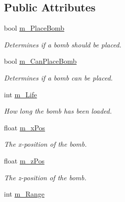 \subsection*{Public Attributes}
\begin{DoxyCompactItemize}
\item 
\hypertarget{classBomb_ab7ac6005ef2beadd2fd6f7895ea9ac70}{bool \hyperlink{classBomb_ab7ac6005ef2beadd2fd6f7895ea9ac70}{m\-\_\-\-Place\-Bomb}}\label{classBomb_ab7ac6005ef2beadd2fd6f7895ea9ac70}

\begin{DoxyCompactList}\small\item\em Determines if a bomb should be placed. \end{DoxyCompactList}\item 
\hypertarget{classBomb_a0e15b6445f078dde98ba005c6f425be4}{bool \hyperlink{classBomb_a0e15b6445f078dde98ba005c6f425be4}{m\-\_\-\-Can\-Place\-Bomb}}\label{classBomb_a0e15b6445f078dde98ba005c6f425be4}

\begin{DoxyCompactList}\small\item\em Determines if a bomb can be placed. \end{DoxyCompactList}\item 
\hypertarget{classBomb_a34b32071d8e343a68e9e9f0d57032930}{int \hyperlink{classBomb_a34b32071d8e343a68e9e9f0d57032930}{m\-\_\-\-Life}}\label{classBomb_a34b32071d8e343a68e9e9f0d57032930}

\begin{DoxyCompactList}\small\item\em How long the bomb has been loaded. \end{DoxyCompactList}\item 
\hypertarget{classBomb_a8f8dad1d7714856984e8b4f9dc1511d5}{float \hyperlink{classBomb_a8f8dad1d7714856984e8b4f9dc1511d5}{m\-\_\-x\-Pos}}\label{classBomb_a8f8dad1d7714856984e8b4f9dc1511d5}

\begin{DoxyCompactList}\small\item\em The x-\/position of the bomb. \end{DoxyCompactList}\item 
\hypertarget{classBomb_a55d6729a7070ab5ee76471bad2940747}{float \hyperlink{classBomb_a55d6729a7070ab5ee76471bad2940747}{m\-\_\-z\-Pos}}\label{classBomb_a55d6729a7070ab5ee76471bad2940747}

\begin{DoxyCompactList}\small\item\em The z-\/position of the bomb. \end{DoxyCompactList}\item 
\hypertarget{classBomb_a62833276f1c6a1a23b4d7c8a236ce646}{int \hyperlink{classBomb_a62833276f1c6a1a23b4d7c8a236ce646}{m\-\_\-\-Range}}\label{classBomb_a62833276f1c6a1a23b4d7c8a236ce646}


\end{DoxyCompactItemize}
